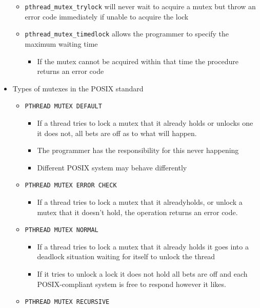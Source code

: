 \documentclass[11pt]{article}
\providecommand{\tightlist}{%
      \setlength{\itemsep}{0pt}\setlength{\parskip}{0pt}}
\begin{document}
\begin{itemize}
  \begin{itemize}
  \tightlist
  \item
    \texttt{pthread\_mutex\_trylock} will never wait to acquire a mutex
    but throw an error code immediately if unable to acquire the lock
  \item
    \texttt{pthread\_mutex\_timedlock} allows the programmer to specify
    the maximum waiting time

    \begin{itemize}
    \tightlist
    \item
      If the mutex cannot be acquired within that time the procedure
      returns an error code
    \end{itemize}
  \end{itemize}
\item
  Types of mutexes in the POSIX standard

  \begin{itemize}
  \tightlist
  \item
    \texttt{PTHREAD\ MUTEX\ DEFAULT}

    \begin{itemize}
    \tightlist
    \item
      If a thread tries to lock a mutex that it already holds or unlocks
      one it does not, all bets are off as to what will happen.
    \item
      The programmer has the responsibility for this never happening
    \item
      Different POSIX system may behave differently
    \end{itemize}
  \item
    \texttt{PTHREAD\ MUTEX\ ERROR\ CHECK}

    \begin{itemize}
    \tightlist
    \item
      If a thread tries to lock a mutex that it alreadyholds, or unlock
      a mutex that it doesn't hold, the operation returns an error code.
    \end{itemize}
  \item
    \texttt{PTHREAD\ MUTEX\ NORMAL}

    \begin{itemize}
    \tightlist
    \item
      If a thread tries to lock a mutex that it already holds it goes
      into a deadlock situation waiting for itself to unlock the thread
    \item
      If it tries to unlock a lock it does not hold all bets are off and
      each POSIX-compliant system is free to respond however it likes.
    \end{itemize}
  \item
    \texttt{PTHREAD\ MUTEX\ RECURSIVE}


\end{itemize}
\end{itemize}
\end{document}
